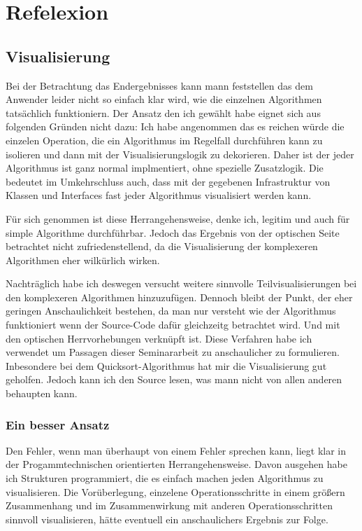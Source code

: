\chapter{Refelexion}
\section*{Visualisierung}
Bei der Betrachtung das Endergebnisses kann mann feststellen das dem Anwender leider nicht so einfach klar wird, wie die einzelnen 
Algorithmen tatsächlich funktioniern. Der Ansatz den ich gewählt habe eignet sich aus folgenden Gründen nicht dazu: 
Ich habe angenommen das es reichen würde die einzelen Operation, die ein Algorithmus im Regelfall durchführen kann zu isolieren und dann
mit der Visualisierungslogik zu dekorieren. Daher ist der jeder Algorithmus ist ganz normal implmentiert, ohne spezielle Zusatzlogik.
Die bedeutet im Umkehrschluss auch, dass mit der gegebenen Infrastruktur von Klassen und Interfaces fast jeder Algorithmus visualisiert
werden kann. 

Für sich genommen ist diese Herrangehensweise, denke ich, legitim und auch
für simple Algorithme durchführbar. Jedoch das Ergebnis von der optischen Seite betrachtet nicht zufriedenstellend, da die 
Visualisierung der komplexeren Algorithmen eher wilkürlich wirken.

Nachträglich habe ich deswegen versucht weitere sinnvolle Teilvisualisierungen bei den komplexeren Algorithmen hinzuzufügen. Dennoch
bleibt der Punkt, der eher geringen Anschaulichkeit bestehen, da man nur versteht wie der Algorithmus funktioniert wenn der Source-Code dafür
gleichzeitg betrachtet wird.
Und mit den optischen Herrvorhebungen verknüpft ist. Diese Verfahren habe ich
verwendet um Passagen dieser Seminararbeit zu anschaulicher zu formulieren. Inbesondere bei dem Quicksort-Algorithmus hat mir die Visualisierung
gut geholfen. Jedoch kann ich den Source lesen, was mann nicht von allen anderen behaupten kann. 

\subsection*{Ein besser Ansatz}
Den Fehler, wenn man überhaupt von einem Fehler sprechen kann, liegt klar in der Progammtechnischen orientierten 
Herrangehensweise. Davon ausgehen habe ich Strukturen programmiert, die es einfach machen jeden Algorithmus zu visualisieren.
Die Vorüberlegung, einzelene Operationsschritte in einem größern Zusammenhang und im Zusammenwirkung mit anderen Operationsschritten sinnvoll 
visualisieren, hätte eventuell ein anschaulichers Ergebnis zur Folge. 

